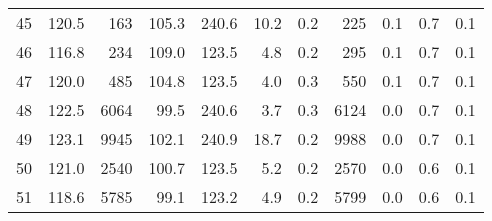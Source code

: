 \begin{tabular}{|r|rrrrr|rrrrr|}
45 & 120.5 & 163 & 105.3 & 240.6 & 10.2 & 0.2 & 225 & 0.1 & 0.7 & 0.1 \\
46 & 116.8 & 234 & 109.0 & 123.5 & 4.8 & 0.2 & 295 & 0.1 & 0.7 & 0.1 \\
47 & 120.0 & 485 & 104.8 & 123.5 & 4.0 & 0.3 & 550 & 0.1 & 0.7 & 0.1 \\
48 & 122.5 & 6064 & 99.5 & 240.6 & 3.7 & 0.3 & 6124 & 0.0 & 0.7 & 0.1 \\
49 & 123.1 & 9945 & 102.1 & 240.9 & 18.7 & 0.2 & 9988 & 0.0 & 0.7 & 0.1 \\
50 & 121.0 & 2540 & 100.7 & 123.5 & 5.2 & 0.2 & 2570 & 0.0 & 0.6 & 0.1 \\
51 & 118.6 & 5785 & 99.1 & 123.2 & 4.9 & 0.2 & 5799 & 0.0 & 0.6 & 0.1 \\
\hline
\end{tabular}
